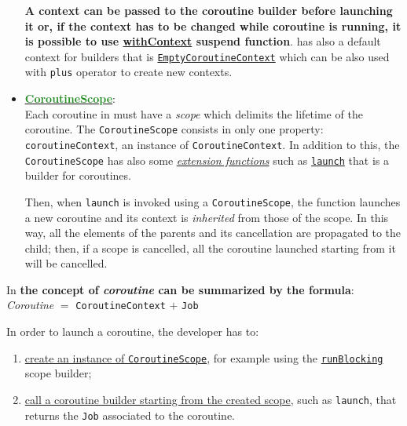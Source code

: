 \begin{itemize}
	\textbf{A context can be passed to the coroutine builder before launching it or, if the context has to be changed while coroutine is running, it is possible to use \href{https://kotlinlang.org/api/kotlinx.coroutines/kotlinx-coroutines-core/kotlinx.coroutines/with-context.html}{withContext} suspend function}.
	\Kotlin has also a default context for builders that is \href{https://kotlinlang.org/api/latest/jvm/stdlib/kotlin.coroutines/-empty-coroutine-context/}{\texttt{EmptyCoroutineContext}} which can be also used with \texttt{plus} operator to create new contexts.
	
	\item \href{https://kotlinlang.org/api/kotlinx.coroutines/kotlinx-coroutines-core/kotlinx.coroutines/-coroutine-scope/}{\underline{\textbf{\textcolor{ForestGreen}{CoroutineScope}}}}:\\
	Each coroutine in \Kotlin must have a \textit{scope} which delimits the lifetime of the coroutine. The \texttt{CoroutineScope} consists in only one property: \texttt{coroutineContext}, an instance of \texttt{CoroutineContext}.
	In addition to this, the \texttt{CoroutineScope} has also some \href{https://kotlinlang.org/docs/extensions.html}{\textit{extension functions}} such as \href{https://kotlinlang.org/api/kotlinx.coroutines/kotlinx-coroutines-core/kotlinx.coroutines/launch.html}{\texttt{launch}} that is a builder for coroutines.
	
	Then, when \texttt{launch} is invoked using a \texttt{CoroutineScope}, the function launches a new coroutine and its context is \textit{inherited} from those of the scope.
	In this way, all the elements of the parents and its cancellation are propagated to the child; then, if a scope is cancelled, all the coroutine launched starting from it will be cancelled.
\end{itemize}

\begin{center}
	In \Kotlin \textbf{the concept of \textit{coroutine} can be summarized by the formula}:\\
		\textit{Coroutine} $=$ \texttt{CoroutineContext} $+$ \texttt{Job}
\end{center}

In order to launch a coroutine, the developer has to:
\begin{enumerate}
	\item \underline{create an instance of \texttt{CoroutineScope}}, for example using the \href{https://kotlinlang.org/api/kotlinx.coroutines/kotlinx-coroutines-core/kotlinx.coroutines/run-blocking.html}{\texttt{runBlocking}} scope builder;
	
	\item \underline{call a coroutine builder starting from the created scope}, such as \texttt{launch}, that returns the \texttt{Job} associated to the coroutine.
\end{enumerate}


